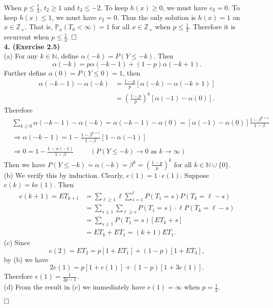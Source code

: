 \documentclass[12pt]{extarticle}
\begin{document}
When $p\leq\frac{1}{3}$, $t_2\geq 1$ and $t_3\leq -2$.
To keep $h(x)\geq 0$, we must have $c_3=0$.
To keep $h(x)\leq 1$, we must have $c_2=0$.
Thus the only solution is $h(x)=1$ on $x\in\mathbb{Z}_+$.
That is, $\mathbb{P}_x(T_0<\infty)=1$ for all $x\in\mathbb{Z}_+$ when $p\leq\frac{1}{3}$.
Therefore it is recurrent when $p\leq\frac{1}{3}$.
$\hspace{\fill}\square$ \\

\noindent
\textbf{4. (Exercise 2.5)} \\
(a) For any $k\in\mathbb{N}$, define $\alpha(-k)=P(Y\leq -k)$.
Then
\[
\alpha(-k)=p \alpha(-k-1)+(1-p)\alpha(-k+1).
\]
Further define $\alpha(0)=P(Y\leq 0)=1$, then
\[
\begin{aligned}
\alpha(-k-1)-\alpha(-k)
&=
\frac{1-p}{p}[\alpha(-k)-\alpha(-k+1)] \\&
=
\left(\frac{1-p}{p}\right)^k[\alpha(-1)-\alpha(0)].
\end{aligned}
\]
Therefore
\[
\begin{aligned}
&\sum_{k\geq 0}\alpha(-k-1)-\alpha(-k)
=
\alpha(-k-1)-\alpha(0)
=
[\alpha(-1)-\alpha(0)]\frac{1-\beta^{k+1}}{1-\beta} \\&
\Rightarrow
\alpha(-k-1)=1-\frac{1-\beta^{k+1}}{1-\beta}[1-\alpha(-1)] \\&
\Rightarrow
0=1-\frac{1-\alpha(-1)}{1-\beta} \hspace{1cm} (P(Y\leq -k)\rightarrow 0\text{ as }k\rightarrow\infty)
\end{aligned}
\]
Then we have $P(Y\leq -k)=\alpha(-k)=\beta^k=\left(\frac{1-p}{p}\right)^k$ for all $k\in\mathbb{N}\cup\{0\}$. \\
(b) We verify this by induction.
Clearly, $e(1)=1\cdot e(1)$.
Suppose $e(k)=ke(1)$.
Then
\[
\begin{aligned}
e(k+1)
=
ET_{k+1}
&=
\sum_{\ell\geq 1}
\ell
\sum_{s=1}^\ell
P(T_1=s)
P(T_k=\ell-s) \\&
=
\sum_{s\geq 1}
\sum_{\ell\geq s}
P(T_1=s)\cdot\ell P(T_k=\ell-s) \\&
=
\sum_{s\geq 1}
P(T_1=s)[ET_k+s] \\&
=
ET_k+ET_1
=
(k+1)ET_1.
\end{aligned}
\]
(c) Since
\[
e(2)=ET_2
=
p[1+ET_1]+(1-p)[1+ET_3],
\]
by (b) we have
\[
2e(1)=p[1+e(1)]+(1-p)[1+3e(1)].
\]
Therefore
$e(1)=\frac{1}{2p-1}$.\\
(d) From the result in (c) we immediately have $e(1)=\infty$ when $p=\frac{1}{2}$.

$\hspace{\fill}\square$ \\
\end{document}

